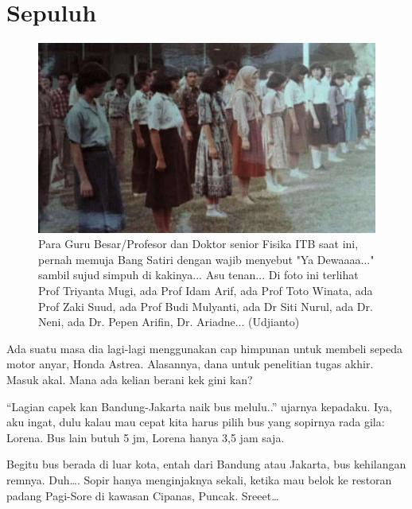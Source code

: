 
\chapter{Sepuluh}

\begin{figure}[htbp]
\centerline{\includegraphics[scale=1.0]{01-10-01}}
\caption{Para Guru Besar/Profesor dan Doktor senior Fisika ITB saat ini,
pernah memuja Bang Satiri dengan wajib menyebut "Ya Dewaaaa..." sambil sujud simpuh di kakinya...
Asu tenan... Di foto ini terlihat Prof Triyanta Mugi, ada Prof Idam Arif, ada Prof Toto Winata,
ada Prof Zaki Suud, ada Prof Budi Mulyanti, ada Dr Siti Nurul, ada Dr. Neni, ada Dr. Pepen Arifin,
Dr. Ariadne... (Udjianto)}
\label{01-10-01}
\end{figure}
%

Ada suatu masa dia lagi-lagi menggunakan cap himpunan untuk membeli sepeda motor anyar, Honda Astrea. Alasannya, dana untuk penelitian tugas akhir. Masuk akal. Mana ada kelian berani kek gini kan?

“Lagian capek kan Bandung-Jakarta naik bus melulu..” ujarnya kepadaku. Iya, aku ingat, dulu kalau mau cepat kita harus pilih bus yang sopirnya rada gila: Lorena. Bus lain butuh 5 jm, Lorena hanya 3,5 jam saja.

Begitu bus berada di luar kota, entah dari Bandung atau Jakarta, bus kehilangan remnya. Duh…. Sopir hanya menginjaknya sekali, ketika mau belok ke restoran padang Pagi-Sore di kawasan Cipanas, Puncak. Sreeet…

